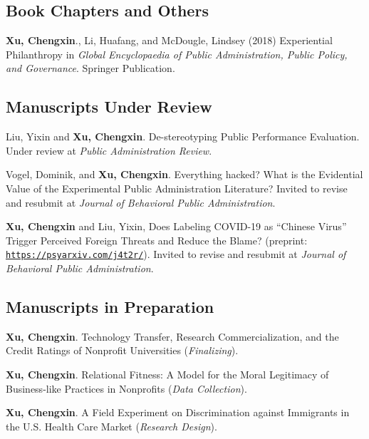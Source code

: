 \documentclass[letterpaper]{article}
\renewenvironment{itemize}{
  \begin{list}{}{
    \setlength{\leftmargin}{1.5em}
  }
}{
  \end{list}
}
\begin{document}
\subsection*{Book Chapters and Others}
\begin{itemize}
	
\item \textbf{Xu, Chengxin}., Li, Huafang, and McDougle, Lindsey (2018) Experiential Philanthropy in {\it Global Encyclopaedia of Public Administration, Public Policy, and Governance}. Springer Publication.

\end{itemize}

\subsection*{Manuscripts Under Review}
\begin{itemize}
	
\item Liu, Yixin and \textbf{Xu, Chengxin}. De-stereotyping Public Performance Evaluation. Under review at {\it Public Administration Review}.

\item Vogel, Dominik, and \textbf{Xu, Chengxin}. Everything hacked? What is the Evidential Value of the Experimental Public Administration Literature? Invited to revise and resubmit at {\it Journal of Behavioral Public Administration}.

\item \textbf{Xu, Chengxin} and Liu, Yixin, Does Labeling COVID-19 as “Chinese Virus” Trigger Perceived Foreign Threats and
Reduce the Blame? (preprint: \href{https://psyarxiv.com/j4t2r/}{\tt https://psyarxiv.com/j4t2r/}). Invited to revise and resubmit at {\it Journal of Behavioral Public Administration}.

\end{itemize}


\subsection*{Manuscripts in Preparation}
\begin{itemize}

\item \textbf{Xu, Chengxin}. Technology Transfer, Research Commercialization, and the Credit Ratings of Nonprofit Universities ({\it Finalizing}).

\item \textbf{Xu, Chengxin}. Relational Fitness: A Model for the Moral Legitimacy of Business-like Practices in Nonprofits ({\it Data Collection}).

\item \textbf{Xu, Chengxin}. A Field Experiment on Discrimination against Immigrants in the U.S. Health Care Market ({\it Research Design}).

\end{itemize}
\end{document}
